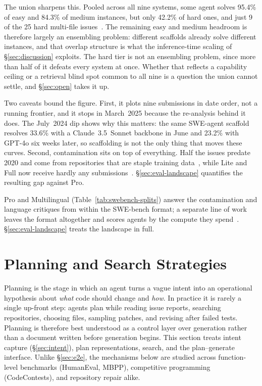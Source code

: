 \documentclass[
  english,        %
  font=times,     %
  twocolumn,      %
]{tumarticle}
\begin{document}
The union sharpens this. Pooled across all nine systems, some agent solves 95.4\%
of easy and 84.3\% of medium instances, but only 42.2\% of hard ones, and just
9 of the 25 hard multi-file issues~\cite{ganhotra2025difficulty}. The remaining
easy and medium headroom is therefore largely an ensembling problem: different
scaffolds already solve different instances, and that overlap structure is what
the inference-time scaling of \S\ref{sec:discussion} exploits. The hard tier is not an ensembling
problem, since more than half of it defeats every system at once. Whether that
reflects a capability ceiling or a retrieval blind spot common to all nine is a
question the union cannot settle, and \S\ref{sec:open} takes it up.

Two caveats bound the figure. First, it plots nine submissions in date order, not
a running frontier, and it stops in March~2025 because the re-analysis behind it
does. The July~2024 dip shows why this matters: the same SWE-agent scaffold
resolves 33.6\% with a Claude~3.5~Sonnet backbone in June and 23.2\% with GPT-4o
six weeks later, so scaffolding is not the only thing that moves these curves.
Second, contamination sits on top of everything. Half the issues predate 2020 and
come from repositories that are staple training data~\cite{epoch2025swebench},
while Lite and Full now receive hardly any submissions~\cite{dissecting2025}.
\S\ref{sec:eval-landscape} quantifies the resulting gap against Pro.

Pro and Multilingual (Table~\ref{tab:swebench-splits}) answer the contamination
and language critiques from within the SWE-bench format; a separate line of work
leaves the format altogether and scores agents by the compute they
spend~\cite{sweeffi2025}. \S\ref{sec:eval-landscape} treats the landscape in full.

\section{Planning and Search Strategies}
\label{sec:planning}

Planning is the stage in which an agent turns a vague intent into an operational
hypothesis about \emph{what} code should change and \emph{how}. In practice it is
rarely a single up-front step: agents plan while reading issue reports, searching
repositories, choosing files, sampling patches, and revising after failed tests.
Planning is therefore best understood as a control layer over generation rather
than a document written before generation begins. This section treats intent
capture (\S\ref{sec:intent}), plan representations, search, and the
plan--generate interface. Unlike \S\ref{sec:e2e}, the mechanisms below are
studied across function-level benchmarks (HumanEval, MBPP), competitive
programming (CodeContests), and repository repair alike.
\end{document}
